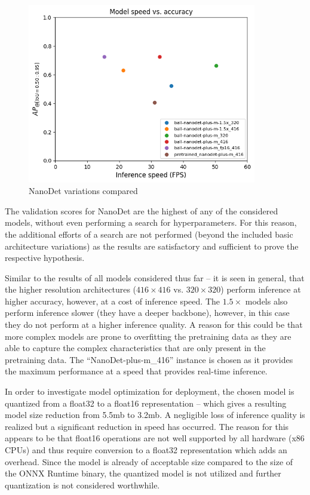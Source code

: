 \documentclass[a4paper,twoside,12pt]{report}
\begin{document}
\begin{figure}[h!]
\begin{center}
\includegraphics[width=10cm]{images/nanodet_compare.png}
\caption{NanoDet variations compared}
\label{fig:nanodet_compare}
\end{center}
\end{figure}

The validation scores for NanoDet are the highest of any of the considered models, without even performing a search for hyperparameters. For this reason, the additional efforts of a search are not performed (beyond the included basic architecture variations) as the results are satisfactory and sufficient to prove the respective hypothesis. 

Similar to the results of all models considered thus far -- it is seen in general, that the higher resolution architectures ($416 \times 416$ vs. $320 \times 320$) perform inference at higher accuracy, however, at a cost of inference speed. The $1.5\times$ models also perform inference slower (they have a deeper backbone), however, in this case they do not perform at a higher inference quality. A reason for this could be that more complex models are prone to overfitting the pretraining data as they are able to capture the complex characteristics that are only present in the pretraining data. The ``NanoDet-plus-m\_416'' instance is chosen as it provides the maximum performance at a speed that provides real-time inference.


In order to investigate model optimization for deployment, the chosen model is quantized from a float32 to a float16 representation -- which gives a resulting model size reduction from 5.5mb to 3.2mb. A negligible loss of inference quality is realized but a significant reduction in speed has occurred. The reason for this appears to be that float16 operations are not well supported by all hardware (x86 CPUs) and thus require conversion to a float32 representation which adds an overhead. Since the model is already of acceptable size compared to the size of the ONNX Runtime binary, the quantized model is not utilized and further quantization is not considered worthwhile.
\end{document}
